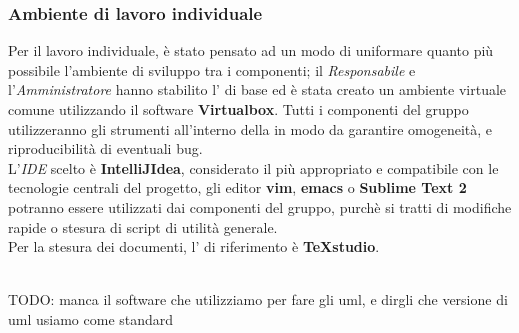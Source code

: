 \subsubsection{Ambiente di lavoro individuale}
Per il lavoro individuale, è stato pensato ad un modo di uniformare quanto più
possibile l'ambiente di sviluppo tra i componenti; il \textit{Responsabile} e
l'\textit{Amministratore} hanno stabilito l' di base ed è stata creato
un ambiente virtuale comune utilizzando il software \textbf{Virtualbox}. Tutti i
componenti del gruppo utilizzeranno gli strumenti all'interno della
 in modo da garantire omogeneità, e riproducibilità di
eventuali bug.\\ L'\textit{IDE} scelto è \textbf{IntelliJIdea}, considerato il
più appropriato e compatibile con le tecnologie centrali del progetto, gli
editor \textbf{vim}, \textbf{emacs} o \textbf{Sublime Text 2} potranno essere
utilizzati dai componenti del gruppo, purchè si tratti di modifiche rapide o
stesura di script di utilità generale.\\
Per la stesura dei documenti, l' di riferimento è \textbf{TeXstudio}.


\\TODO: manca il software che utilizziamo per fare gli uml, e dirgli che versione di uml usiamo come standard